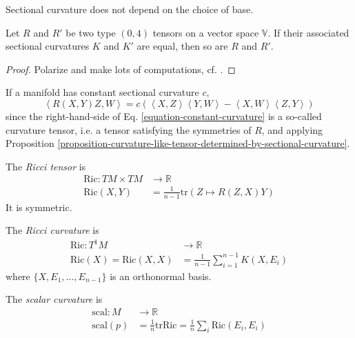 \begin{lemma}
\label{lemma-sectional-curvature-is-well-defined}
Sectional curvature does not depend on the choice of base.
\end{lemma}

\begin{proposition}
\label{proposition-curvature-like-tensor-determined-by-sectional-curvature}
Let $R$ and $R'$ be two type $(0,4)$ tensors on a vector space $\mathbb{V}$. If
their associated sectional curvatures $K$ and $K'$ are equal, then so are $R$
and $R'$.
\end{proposition}

\begin{proof}
Polarize and make lots of computations, cf. \cite{doc}.
\end{proof}

If a manifold has constant sectional curvature $c$,
\begin{equation}
\label{equation-constant-curvature}
\left<R(X,Y)Z,W\right>=
c(\left<X,Z\right>\left<Y,W\right>-\left<X,W\right>\left<Z,Y\right>)
\end{equation}
since the right-hand-side of Eq. \ref{equation-constant-curvature} is a
so-called curvature tensor, i.e. a tensor satisfying the symmetries of $R$, and
applying Proposition 
\ref{proposition-curvature-like-tensor-determined-by-sectional-curvature}.

The {\it Ricci tensor} is
\begin{equation}
\label{equation-Ricci-tensor}
\begin{aligned}
\text{Ric}: TM\times TM &\longrightarrow \mathbb{R} \\
\text{Ric}(X,Y)&=\frac{1}{n-1}\text{tr}(Z\mapsto R(Z,X)Y)
\end{aligned}
\end{equation}
It is symmetric.

The {\it Ricci curvature} is
\begin{equation}
\label{equation-Ricci-curvature}
\begin{aligned}
\text{Ric}: T^1M &\longrightarrow \mathbb{R} \\
\text{Ric}(X)=\text{Ric}(X,X)&=\frac{1}{n-1}\sum_{i=1}^{n-1}K(X,E_i)
\end{aligned}
\end{equation}
where $\{X,E_1,\ldots,E_{n-1}\}$ is an orthonormal basis.

The {\it scalar curvature} is
\begin{equation}
\label{equation-scalar-curvature}
\begin{aligned}
\text{scal}: M &\longrightarrow \mathbb{R} \\
\text{scal}(p)&=\frac{1}{n}\text{tr}\text{Ric}
=\frac{1}{n}\sum_i\text{Ric}(E_i,E_i)
\end{aligned}
\end{equation}

